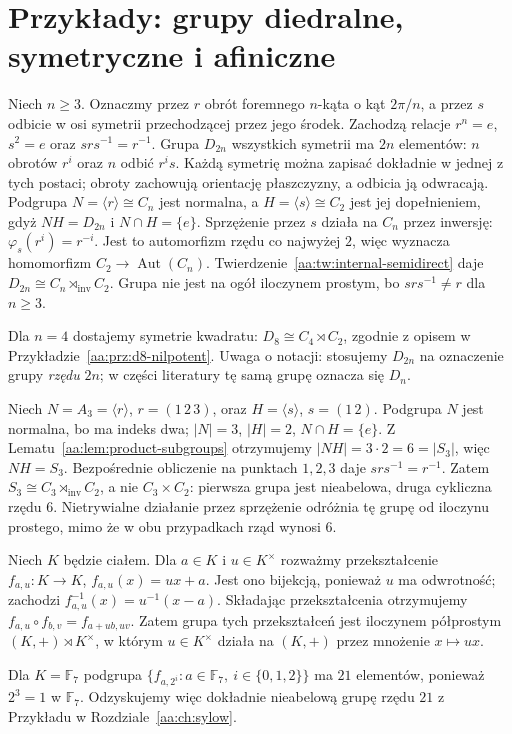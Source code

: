 \section{Przykłady: grupy diedralne, symetryczne i afiniczne}
\begin{przyklad}
\label{aa:prz:dihedral-semidirect}
Niech $n\ge3$. Oznaczmy przez $r$ obrót foremnego $n$-kąta
o kąt $2\pi/n$, a przez $s$ odbicie w osi symetrii przechodzącej
przez jego środek. Zachodzą relacje
$r^n=e$, $s^2=e$ oraz $srs^{-1}=r^{-1}$.
Grupa $D_{2n}$ wszystkich symetrii ma $2n$ elementów:
$n$ obrotów $r^i$ oraz $n$ odbić $r^i s$.
Każdą symetrię można zapisać dokładnie w jednej z tych postaci;
obroty zachowują orientację płaszczyzny, a odbicia ją odwracają.
Podgrupa $N=\langle r\rangle\cong C_n$ jest normalna,
a $H=\langle s\rangle\cong C_2$ jest jej dopełnieniem,
gdyż $NH=D_{2n}$ i $N\cap H=\{e\}$.
Sprzężenie przez $s$ działa na $C_n$ przez inwersję:
$\varphi_s(r^i)=r^{-i}$.
Jest to automorfizm rzędu co najwyżej $2$, więc wyznacza
homomorfizm $C_2\to\operatorname{Aut}(C_n)$.
Twierdzenie~\ref{aa:tw:internal-semidirect} daje
$D_{2n}\cong C_n\rtimes_{\mathrm{inv}}C_2$.
Grupa nie jest na ogół iloczynem prostym, bo $srs^{-1}\ne r$
dla $n\ge3$.

Dla $n=4$ dostajemy symetrie kwadratu:
$D_8\cong C_4\rtimes C_2$, zgodnie z opisem
w Przykładzie~\ref{aa:prz:d8-nilpotent}.
Uwaga o notacji: stosujemy $D_{2n}$ na oznaczenie grupy
\emph{rzędu} $2n$; w części literatury tę samą grupę oznacza się $D_n$.
\end{przyklad}

\begin{przyklad}
\label{aa:prz:s3-semidirect}
Niech $N=A_3=\langle r\rangle$,
$r=(1\,2\,3)$, oraz $H=\langle s\rangle$,
$s=(1\,2)$.
Podgrupa $N$ jest normalna, bo ma indeks dwa;
$|N|=3$, $|H|=2$, $N\cap H=\{e\}$.
Z Lematu~\ref{aa:lem:product-subgroups} otrzymujemy
$|NH|=3\cdot2=6=|S_3|$, więc $NH=S_3$.
Bezpośrednie obliczenie na punktach $1,2,3$ daje
$srs^{-1}=r^{-1}$.
Zatem $S_3\cong C_3\rtimes_{\mathrm{inv}}C_2$,
a nie $C_3\times C_2$: pierwsza grupa jest nieabelowa,
druga cykliczna rzędu $6$.
Nietrywialne działanie przez sprzężenie odróżnia tę grupę
od iloczynu prostego, mimo że w obu przypadkach rząd wynosi $6$.
\end{przyklad}

\begin{przyklad}
\label{aa:prz:affine-group}
Niech $K$ będzie ciałem. Dla $a\in K$ i $u\in K^\times$
rozważmy przekształcenie $f_{a,u}:K\to K$,
$f_{a,u}(x)=ux+a$. Jest ono bijekcją, ponieważ
$u$ ma odwrotność; zachodzi
$f_{a,u}^{-1}(x)=u^{-1}(x-a)$.
Składając przekształcenia otrzymujemy
$f_{a,u}\circ f_{b,v}=f_{a+ub,uv}$.
Zatem grupa tych przekształceń jest iloczynem półprostym
$(K,+)\rtimes K^\times$, w którym
$u\in K^\times$ działa na $(K,+)$ przez mnożenie $x\mapsto ux$.

Dla $K=\mathbb F_7$ podgrupa
$\{f_{a,2^i}:a\in\mathbb F_7,\ i\in\{0,1,2\}\}$
ma $21$ elementów, ponieważ $2^3=1$ w $\mathbb F_7$.
Odzyskujemy więc dokładnie nieabelową grupę rzędu $21$
z Przykładu w Rozdziale~\ref{aa:ch:sylow}.
\end{przyklad}


